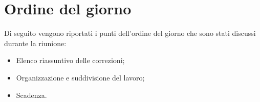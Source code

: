 \clearpage
\section{Ordine del giorno}
Di seguito vengono riportati i punti dell’ordine del giorno che sono stati discussi durante la riunione:
\begin{itemize}
	\item Elenco riassuntivo delle correzioni;
	\item Organizzazione e suddivisione del lavoro;
	\item Scadenza.
\end{itemize}